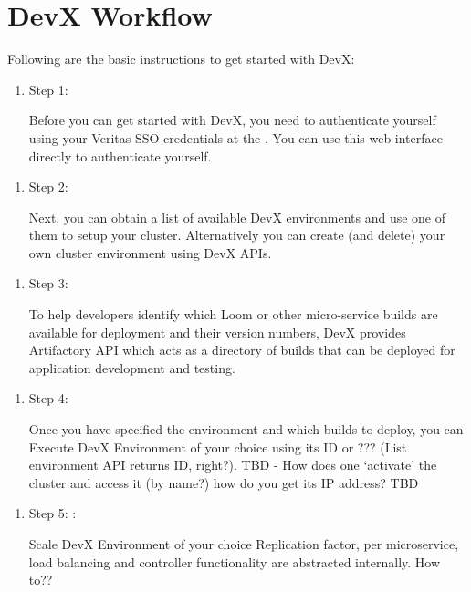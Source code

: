 \documentclass[letterpaper,10pt,english]{sphinxmanual}
\begin{document}
\section{DevX Workflow}
\label{\detokenize{devx:devx-workflow}}
Following are the basic instructions to get started with DevX:
\begin{enumerate}
\item {} 
Step 1: 

Before you can get started with DevX, you need to authenticate yourself using your Veritas SSO credentials at the .  You can use this web interface directly to authenticate yourself.

\end{enumerate}
\begin{enumerate}
\item {} 
Step 2: 

Next, you can obtain a list of available DevX environments and use one of them to setup your cluster.  Alternatively you can create (and delete) your own cluster environment using DevX APIs.

\end{enumerate}
\begin{enumerate}
\item {} 
Step 3: 

To help developers identify which Loom or other micro-service builds are available for deployment and their version numbers, DevX provides Artifactory API which acts as a directory of builds that can be deployed for application development and testing.

\end{enumerate}
\begin{enumerate}
\item {} 
Step 4: 

Once you have specified the environment and which builds to deploy, you can Execute DevX Environment of your choice \textendash{} using its ID or ??? (List environment API returns ID, right?). TBD -   How does one ‘activate’ the cluster and access it (by name?) \textendash{} how do you get its IP address? TBD

\end{enumerate}
\begin{enumerate}
\item {} 
Step 5: :

Scale DevX Environment of your choice \textendash{} Replication factor, per microservice, load balancing and controller functionality are abstracted internally.  How to??

\end{enumerate}
\end{document}
